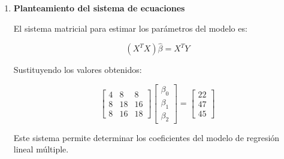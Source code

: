 \begin{enumerate}[label=\alph*)]
\item \textbf{Planteamiento del sistema de ecuaciones}

El sistema matricial para estimar los parámetros del modelo es:

\[
(X^T X)\hat{\beta} = X^T Y
\]

Sustituyendo los valores obtenidos:

\[
\begin{bmatrix}
4 & 8 & 8 \\
8 & 18 & 16 \\
8 & 16 & 18
\end{bmatrix}
\begin{bmatrix}
\beta_0 \\
\beta_1 \\
\beta_2
\end{bmatrix}
=
\begin{bmatrix}
22 \\
47 \\
45
\end{bmatrix}
\]

Este sistema permite determinar los coeficientes del modelo de regresión lineal múltiple.

\end{enumerate}